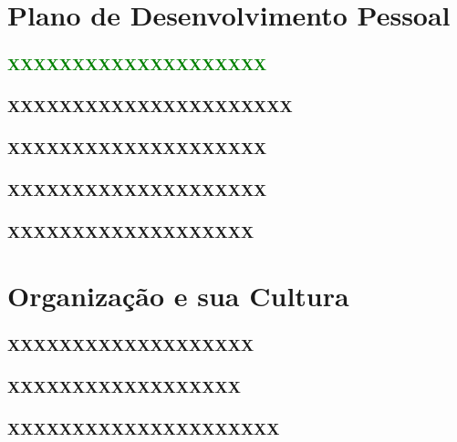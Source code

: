 

\section{Plano de Desenvolvimento Pessoal}
\begin{frame}
\frametitle{\textcolor{green}{XXXXXXXXXXXXXXXXXXXX}}
\end{frame}
\begin{frame}
\frametitle{XXXXXXXXXXXXXXXXXXXXXX}
\end{frame}
\begin{frame}
\frametitle{XXXXXXXXXXXXXXXXXXXX}
\end{frame}
\begin{frame}
\frametitle{XXXXXXXXXXXXXXXXXXXX}
\end{frame}
\begin{frame}
\frametitle{XXXXXXXXXXXXXXXXXXX}
\end{frame}
\section{Organização e sua Cultura}
\begin{frame}
\frametitle{XXXXXXXXXXXXXXXXXXX}
\end{frame}
\begin{frame}
\frametitle{XXXXXXXXXXXXXXXXXX}
\end{frame}
\begin{frame}
\frametitle{XXXXXXXXXXXXXXXXXXXXX}
\end{frame}
